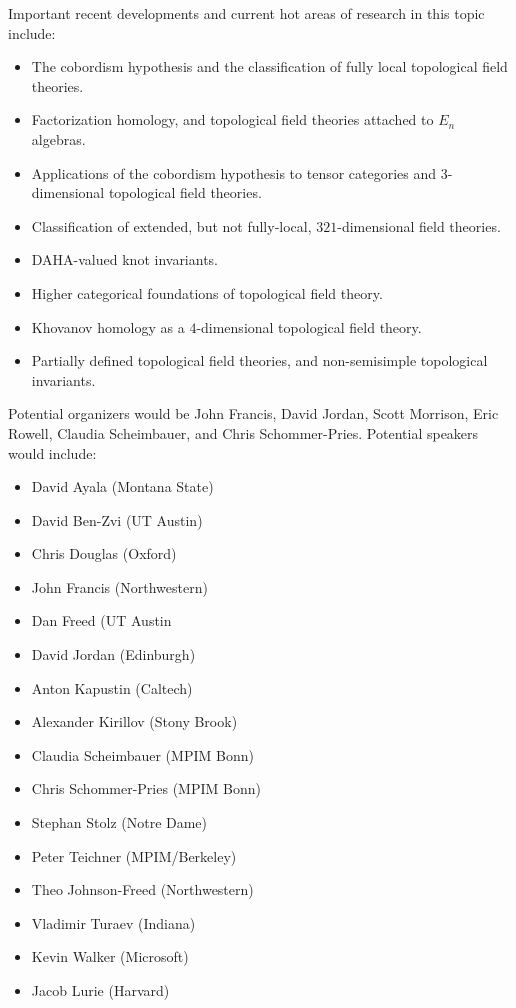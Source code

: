 \documentclass[12pt]{article}
\begin{document}
Important recent developments and current hot areas of research in this topic include:
\begin{itemize}
  \setlength{\itemsep}{1pt}
  \setlength{\parskip}{0pt}
  \setlength{\parsep}{0pt}
  \item The cobordism hypothesis and the classification of fully local topological field theories.
\item Factorization homology, and topological field theories attached to $E_n$ algebras.
\item Applications of the cobordism hypothesis to tensor categories and $3$-dimensional topological field theories.
\item Classification of extended, but not fully-local, $321$-dimensional field theories.
\item DAHA-valued knot invariants.
\item Higher categorical foundations of topological field theory.
\item Khovanov homology as a $4$-dimensional topological field theory.
\item Partially defined topological field theories, and non-semisimple topological invariants.
\end{itemize}



Potential organizers would be John Francis, David Jordan, Scott Morrison, Eric Rowell, Claudia Scheimbauer, and Chris Schommer-Pries.
Potential speakers would include:
\begin{multicols}{2}
\begin{itemize}
  \setlength{\itemsep}{1pt}
  \setlength{\parskip}{0pt}
  \setlength{\parsep}{0pt}
\item David Ayala	(Montana State)
\item David Ben-Zvi (UT Austin)
\item Chris Douglas	(Oxford)
\item John Francis (Northwestern)
\item Dan Freed	(UT Austin
\item David Jordan (Edinburgh)
\item Anton Kapustin	(Caltech)
\item Alexander Kirillov	(Stony Brook)
\item Claudia Scheimbauer	(MPIM Bonn)
\item Chris Schommer-Pries	(MPIM Bonn)
\item Stephan Stolz	(Notre Dame)
\item Peter Teichner	(MPIM/Berkeley)
\item Theo Johnson-Freed	(Northwestern)
\item Vladimir Turaev	(Indiana)
\item Kevin Walker (Microsoft)
\item Jacob Lurie (Harvard)
\end{itemize}
\end{multicols}
\end{document}
